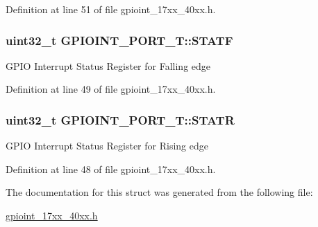 Definition at line 51 of file gpioint\+\_\+17xx\+\_\+40xx.\+h.

\subsubsection[{\texorpdfstring{S\+T\+A\+TF}{STATF}}]{ uint32\+\_\+t G\+P\+I\+O\+I\+N\+T\+\_\+\+P\+O\+R\+T\+\_\+\+T\+::\+S\+T\+A\+TF}\hypertarget{structGPIOINT__PORT__T_a4439b8e7ddaac1768c0caf158a884375}{}\label{structGPIOINT__PORT__T_a4439b8e7ddaac1768c0caf158a884375}
G\+P\+IO Interrupt Status Register for Falling edge 

Definition at line 49 of file gpioint\+\_\+17xx\+\_\+40xx.\+h.

\subsubsection[{\texorpdfstring{S\+T\+A\+TR}{STATR}}]{ uint32\+\_\+t G\+P\+I\+O\+I\+N\+T\+\_\+\+P\+O\+R\+T\+\_\+\+T\+::\+S\+T\+A\+TR}\hypertarget{structGPIOINT__PORT__T_afff0c48e8b49a668e3f7125b5443280a}{}\label{structGPIOINT__PORT__T_afff0c48e8b49a668e3f7125b5443280a}
G\+P\+IO Interrupt Status Register for Rising edge 

Definition at line 48 of file gpioint\+\_\+17xx\+\_\+40xx.\+h.



The documentation for this struct was generated from the following file\+:\begin{DoxyCompactItemize}
\item 
\hyperlink{gpioint__17xx__40xx_8h}{gpioint\+\_\+17xx\+\_\+40xx.\+h}\end{DoxyCompactItemize}
